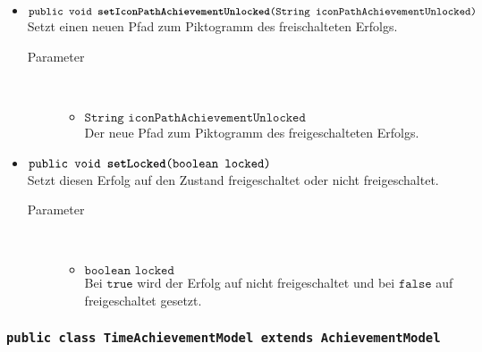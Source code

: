 \begin{description}
\begin{itemize}
			\item $\texttt{public void \textbf{setIconPathAchievementUnlocked}(String iconPathAchievementUnlocked)}$ \\ Setzt einen neuen Pfad zum Piktogramm des freischalteten Erfolgs.
				\begin{description}
					\item[Parameter] \hfill \\
					\vspace{-.8cm}
					\begin{itemize}
						\item $\texttt{String iconPathAchievementUnlocked}$ \\ Der neue Pfad zum Piktogramm des freigeschalteten Erfolgs.
					\end{itemize}
				\end{description}
				
			\item $\texttt{public void \textbf{setLocked}(boolean locked)}$ \\ Setzt diesen Erfolg auf den Zustand freigeschaltet oder nicht freigeschaltet.
				\begin{description}
					\item[Parameter] \hfill \\
					\vspace{-.8cm}
					\begin{itemize}
						\item $\texttt{boolean locked}$ \\ Bei $\texttt{true}$ wird der Erfolg auf nicht freigeschaltet und bei $\texttt{false}$ auf freigeschaltet gesetzt.
					\end{itemize}
				\end{description}
		
			\end{itemize}
		\end{description}
		
		\subsubsection{\normalfont \texttt{public class \textbf{TimeAchievementModel} extends AchievementModel}}
		
